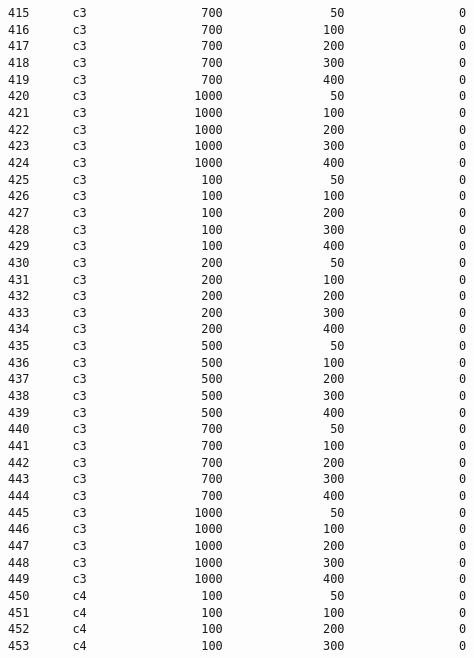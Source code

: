 \documentclass[11pt]{article}
\begin{document}
\begin{Verbatim}[commandchars=\\\{\}]
415      c3                700               50                0   
416      c3                700              100                0   
417      c3                700              200                0   
418      c3                700              300                0   
419      c3                700              400                0   
420      c3               1000               50                0   
421      c3               1000              100                0   
422      c3               1000              200                0   
423      c3               1000              300                0   
424      c3               1000              400                0   
425      c3                100               50                0   
426      c3                100              100                0   
427      c3                100              200                0   
428      c3                100              300                0   
429      c3                100              400                0   
430      c3                200               50                0   
431      c3                200              100                0   
432      c3                200              200                0   
433      c3                200              300                0   
434      c3                200              400                0   
435      c3                500               50                0   
436      c3                500              100                0   
437      c3                500              200                0   
438      c3                500              300                0   
439      c3                500              400                0   
440      c3                700               50                0   
441      c3                700              100                0   
442      c3                700              200                0   
443      c3                700              300                0   
444      c3                700              400                0   
445      c3               1000               50                0   
446      c3               1000              100                0   
447      c3               1000              200                0   
448      c3               1000              300                0   
449      c3               1000              400                0   
450      c4                100               50                0   
451      c4                100              100                0   
452      c4                100              200                0   
453      c4                100              300                0   

\end{Verbatim}
\end{document}
